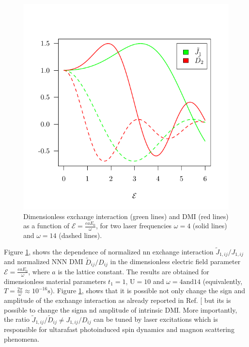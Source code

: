 \documentclass[aps,prl,twocolumn,amsmath,amssymb,nobibnotes]{revtex4-1}%
\renewcommand{\cite}[1]{{[}\onlinecite{#1}{]}}
\begin{document}
\begin{figure}[t]
\centering
\includegraphics[width=\columnwidth]{../Figures/NNvsNNN1.pdf}
\caption{Dimensionless exchange interaction (green lines) and DMI (red lines) as a function of $\mathcal{E} = \frac{eaE_0}{\omega}$, for two laser frequencies $\omega = 4$ (solid lines) and $\omega = 14$ (dashed lines).}
\label{fig2}
\end{figure}


Figure \ref{fig2}, shows the dependence of normalized nn exchange interaction $\tilde{J}_{1,ij}/J_{1,ij}$ and normalized NNN DMI $\tilde{D}_{ij}/D_{ij}$ in the dimensionless electric field parameter $\mathcal{E} = \frac{e a E_0}{\omega}$, where $a$ is the lattice constant. The results are obtained for dimensionless material parameters $t_1=1$, $\text{U} = 10$ and $\omega = 4 \mathrm{and} 14$ (equivalently, $T = \frac{2\pi}{\omega} \approx 10^{-16}\text{s}$). Figure \ref{fig2}, shows that it is possible not only change the sign and amplitude of the exchange interaction as already reported in Ref. \cite{Mentink2015} but its is possible to change the signa nd amplitude of intrinsic DMI. More importantly, the ratio $\tilde{J}_{1,ij}/\tilde{D}_{ij}\neq J_{1,ij}/D_{ij}$ can be tuned by laser excitations which is responsible for ultarafast photoinduced spin dynamics and magnon scattering phenomena.
\end{document}

